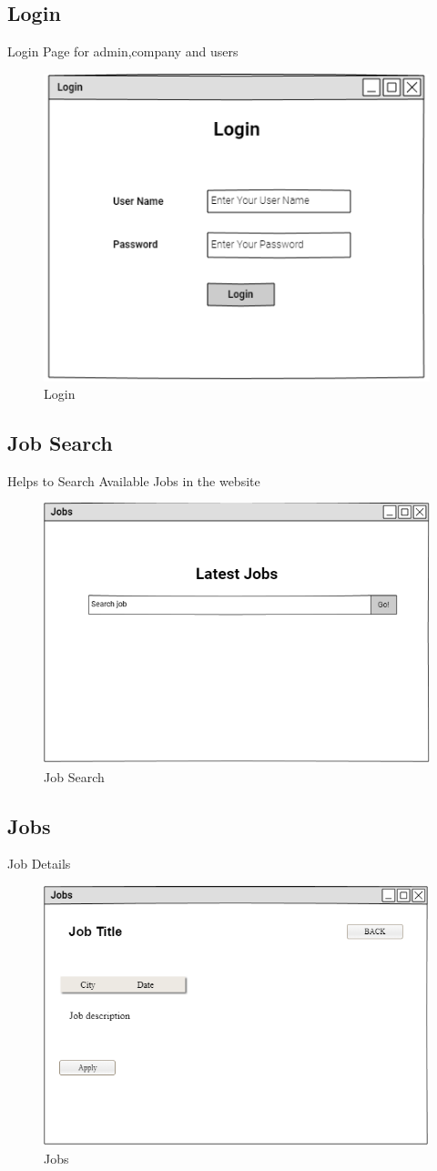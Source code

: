 \documentclass[a4paper,12pt]{report}
\begin{document}
\subsection {Login}
Login Page for admin,company and users
\begin{figure}[bph]
	\centering
	\includegraphics[width=.4\linewidth]{img/login}
	\caption{Login}
\end{figure}
\pagebreak

\subsection {Job Search}
Helps to Search Available Jobs in the website
\begin{figure}[bph]
	\centering
	\includegraphics[width=.65\linewidth]{img/searchjob}
	\caption{Job Search}
\end{figure}
\subsection {Jobs}
Job Details
\begin{figure}[bph]
	\centering
	\includegraphics[width=.6\linewidth]{img/searchjobapply}
	\caption{Jobs}
\end{figure}
\pagebreak
\end{document}
